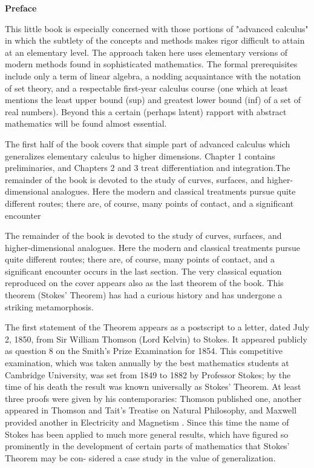 \thispagestyle{empty}
\vspace*{4em}
\begin{center}
  {\bfseries\sffamily\Huge Preface}
\end{center}
\vspace*{5em}
This little book is especially concerned with those portions of
"advanced calculus" in which the subtlety of the concepts and
methods makes rigor difficult to attain at an elementary level.
The approach taken here uses elementary versions of modern
methods found in sophisticated mathematics. The formal
prerequisites include only a term of linear algebra, a nodding
acquaintance with the notation of set theory, and a respectable
first-year calculus course (one which at least mentions the
least upper bound (sup) and greatest lower bound (inf) of a
set of real numbers). Beyond this a certain (perhaps latent)
rapport with abstract mathematics will be found almost
essential.

The first half of the book covers that simple part of advanced 
calculus which generalizes elementary calculus to higher dimensions.
Chapter 1 contains preliminaries, and Chapters 2 and 3 treat 
differentiation and integration.The remainder of the book is devoted 
to the study of curves, surfaces, and higher-dimensional analogues.
Here the modern and classical treatments pursue quite different routes; 
there are, of course, many points of contact, and a significant encounter

The remainder of the book is devoted to the study of curves,
surfaces, and higher-dimensional analogues. Here the modern and classical 
treatments pursue quite different routes; there are, of course, 
many points of contact, and a significant encounter occurs 
in the last section. The very classical equation reproduced 
on the cover appears also as the last theorem of the
book. This theorem (Stokes' Theorem) has had a curious
history and has undergone a striking metamorphosis.

The first statement of the Theorem appears as a postscript
to a letter, dated July 2, 1850, from Sir William Thomson
(Lord Kelvin) to Stokes. It appeared publicly as question 8
on the Smith's Prize Examination for 1854.
This competitive examination, which was taken annually by the best 
mathematics students at Cambridge University, was set from 1849 to
1882 by Professor Stokes; by the time of his death the result
was known universally as Stokes' Theorem. At least three
proofs were given by his contemporaries: Thomson published
one, another appeared in Thomson and Tait's Treatise on
Natural Philosophy, and Maxwell provided another in Electricity 
and Magnetism \cite{maxwell1954electricity}. Since this time the name of
Stokes has been applied to much more general results, which
have figured so prominently in the development of certain
parts of mathematics that Stokes' Theorem may be con-
sidered a case study in the value of generalization.

